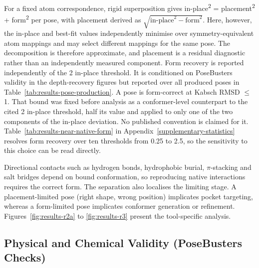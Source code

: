 For a fixed atom correspondence, rigid superposition gives in-place\textsuperscript{2} = placement\textsuperscript{2} + form\textsuperscript{2} per pose, with placement derived as \(\sqrt{\text{in-place}^{2}-\text{form}^{2}}\). Here, however, the in-place and best-fit values independently minimise over symmetry-equivalent atom mappings and may select different mappings for the same pose. The decomposition is therefore approximate, and placement is a residual diagnostic rather than an independently measured component. Form recovery is reported independently of the 2\angstrom{} in-place threshold. It is conditioned on PoseBusters validity in the depth-recovery figures but reported over all produced poses in Table~\ref{tab:results-pose-production}. A pose is form-correct at Kabsch RMSD \ensuremath{\leq} 1\angstrom{}. That bound was fixed before analysis as a conformer-level counterpart to the cited 2\angstrom{} in-place threshold, half its value and applied to only one of the two components of the in-place deviation. No published convention is claimed for it. Table~\ref{tab:results-near-native-form} in Appendix~\ref{supplementary-statistics} resolves form recovery over ten thresholds from 0.25 to 2.5\angstrom{}, so the sensitivity to this choice can be read directly.

Directional contacts such as hydrogen bonds, hydrophobic burial, \ensuremath{\pi}-stacking and salt bridges depend on bound conformation, so reproducing native interactions requires the correct form. The separation also localises the limiting stage. A placement-limited pose (right shape, wrong position) implicates pocket targeting, whereas a form-limited pose implicates conformer generation or refinement. Figures~\ref{fig:results-r2a} to \ref{fig:results-r3} present the tool-specific analysis.

\hypertarget{physical-and-chemical-validity-posebusters-checks}{%
\subsection{Physical and Chemical Validity (PoseBusters Checks)}\label{physical-and-chemical-validity-posebusters-checks}}

